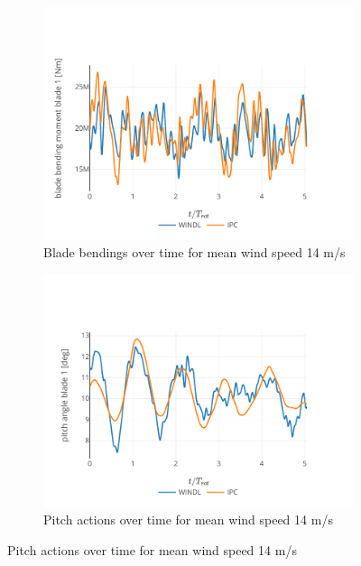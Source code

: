 \begin{figure}[hbt]
  \centering
  \begin{subfigure}[b]{0.48\textwidth}
      \centering
      \includegraphics[width=\textwidth]{images/adjusted_blade_rollout.pdf}
      \caption{Blade bendings over time for mean wind speed 14 m/s}
      \label{fig:adjusted-rollout-blade}
  \end{subfigure}
  \begin{subfigure}[b]{0.48\textwidth}
    \centering
    \includegraphics[width=\textwidth]{images/adjusted_pitch_rollout.pdf}
    \caption{Pitch actions over time for mean wind speed 14 m/s}
    \label{fig:adjusted-rollout-pitch}
  \end{subfigure}

\end{figure}
